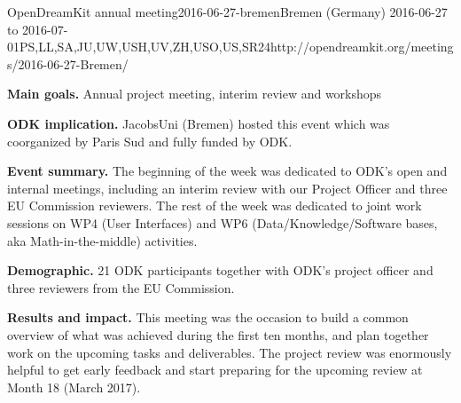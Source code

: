 \begin{event}{OpenDreamKit annual meeting}{2016-06-27-bremen}{Bremen (Germany) 2016-06-27 to 2016-07-01}{PS,LL,SA,JU,UW,USH,UV,ZH,USO,US,SR}{24}{http://opendreamkit.org/meetings/2016-06-27-Bremen/}

  \textbf{Main goals.} Annual project meeting, interim review and workshops

  \textbf{ODK implication.} JacobsUni (Bremen) hosted this event which
  was coorganized by Paris Sud and fully funded by ODK.

  \textbf{Event summary.} The beginning of the week was dedicated to
  ODK’s open and internal meetings, including an interim review with
  our Project Officer and three EU Commission reviewers. The rest of
  the week was dedicated to joint work sessions on WP4 (User
  Interfaces) and WP6 (Data/Knowledge/Software bases, aka
  Math-in-the-middle) activities.

  \textbf{Demographic.} 21 ODK participants together with ODK's
  project officer and three reviewers from the EU Commission.

  \textbf{Results and impact.} This meeting was the occasion to build
  a common overview of what was achieved during the first ten months,
  and plan together work on the upcoming tasks and deliverables. The
  project review was enormously helpful to get early feedback
  and start preparing for the upcoming review at Month 18
  (March 2017).


\end{event}
